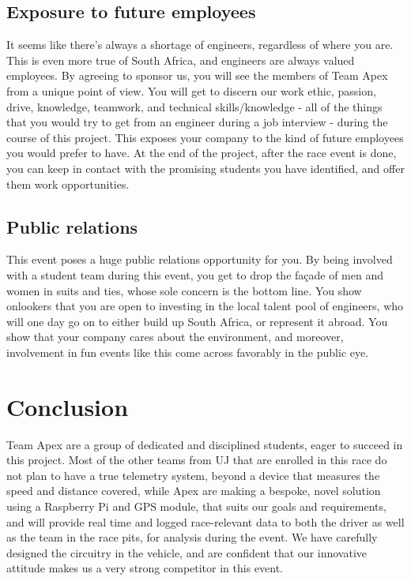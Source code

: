 \documentclass[a4paper, 12pt]{article}
\begin{document}
		\subsection{Exposure to future employees} %
		\label{sub:exposure_to_future_employees}
			It seems like there's always a shortage of engineers, regardless of where you are. This is even more true of South Africa, and engineers are always valued employees. By agreeing to sponsor us, you will see the members of Team Apex from a unique point of view. You will get to discern our work ethic, passion, drive, knowledge, teamwork, and technical skills/knowledge - all of the things that you would try to get from an engineer during a job interview - during the course of this project. This exposes your company to the kind of future employees you would prefer to have. At the end of the project, after the race event is done, you can keep in contact with the promising students you have identified, and offer them work opportunities.
		\subsection{Public relations} %
		\label{sub:public_relations}
			This event poses a huge public relations opportunity for you. By being involved with a student team during this event, you get to drop the fa\c{c}ade of men and women in suits and ties, whose sole concern is the bottom line. You show onlookers that you are open to investing in the local talent pool of engineers, who will one day go on to either build up South Africa, or represent it abroad. You show that your company cares about the environment, and moreover, involvement in fun events like this come across favorably in the public eye.
	
	\section{Conclusion} %
	\label{sec:conclusion}
		Team Apex are a group of dedicated and disciplined students, eager to succeed in this project. Most of the other teams from UJ that are enrolled in this race do not plan to have a true telemetry system, beyond a device that measures the speed and distance covered, while Apex are making a bespoke, novel solution using a Raspberry Pi and GPS module, that suits our goals and requirements, and will provide real time and logged race-relevant data to both the driver as well as the team in the race pits, for analysis during the event. We have carefully designed the circuitry in the vehicle, and are confident that our innovative attitude makes us a very strong competitor in this event.
\end{document}
